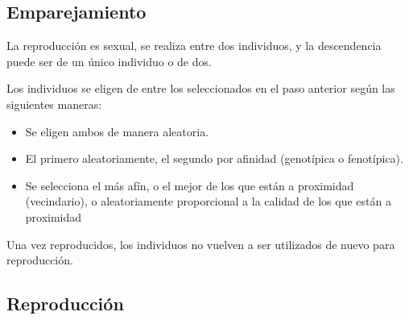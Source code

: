 \documentclass[12pt, twoside, openright]{report} %
\begin{document}
\subsection{Emparejamiento}
La reproducción es sexual, se realiza entre dos individuos, y la descendencia puede ser de un único individuo o de dos.
\pagebreak

Los individuos se eligen de entre los seleccionados en el paso anterior según las siguientes maneras:
\begin{itemize}
	\item Se eligen ambos de manera aleatoria.
	\item El primero aleatoriamente, el segundo por afinidad (genotípica o fenotípica).
	\item Se selecciona el más afín, o el mejor de los que están a proximidad (vecindario), o aleatoriamente proporcional a la calidad de los que están a proximidad
\end{itemize}
Una vez reproducidos, los individuos no vuelven a ser utilizados de nuevo para reproducción.

\subsection{Reproducción}
\end{document}
